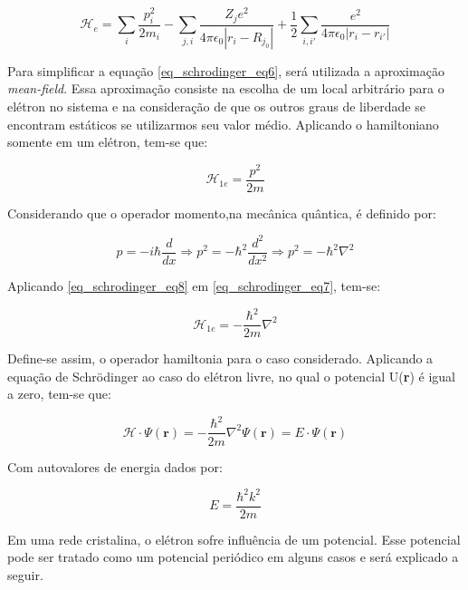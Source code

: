       \begin{equation}\label{eq_schrodinger_eq6}
        \mathcal{H}_{e} = 
          \sum_{i} \frac{p_{i}^2}{2m_{i}} 
          -  \sum_{j, i} \frac{Z_{j} e^2}{4\pi\epsilon_{0}\left|r_{i} - R_{j_{0}}\right|} 
          + \frac{1}{2} \sum_{i, i'} \frac{e^2}{4\pi\epsilon_{0}\left|r_{i} - r_{i'}\right|}
      \end{equation}

      \par Para simplificar a equação \eqref{eq_schrodinger_eq6}, será utilizada a aproximação \textit{mean-field}\cite{qm_fis10}. Essa aproximação consiste na escolha de um local arbitrário para o elétron no sistema e na consideração de que os outros graus de liberdade se encontram estáticos se utilizarmos seu valor médio. Aplicando o hamiltoniano somente em um elétron, tem-se que:

      \begin{equation}\label{eq_schrodinger_eq7}
        \mathcal{H}_{1e} = \frac{p^2}{2m}
      \end{equation}

      Considerando que o operador momento,na mecânica quântica, é definido por\cite{qm_fis11}:

      \begin{equation}\label{eq_schrodinger_eq8}
        p = -i\hbar\frac{d}{dx} \Longrightarrow
        p^2 = -\hbar^2 \frac{d^2}{dx^2} \Longrightarrow
        p^2 = -\hbar^2 \nabla^2
      \end{equation}

      Aplicando \eqref{eq_schrodinger_eq8} em \eqref{eq_schrodinger_eq7}, tem-se:

      \begin{equation}\label{eq_schrodinger_eq9}
        \mathcal{H}_{1e} = - \frac{\hbar^2}{2m}\nabla^2
      \end{equation}

      Define-se assim, o operador hamiltonia para o caso considerado. Aplicando a equação de Schrödinger ao caso do elétron livre, no qual o potencial U(\textbf{r}) é igual a zero, tem-se que:

      \begin{equation}\label{eq_schrodinger_eq10}
        \mathcal{H} \cdot \Psi(\mathbf{r}) =
          -\frac{\hbar^2}{2m} \nabla^2 \Psi(\mathbf{r}) =
          E \cdot \Psi(\mathbf{r})
      \end{equation}

      Com autovalores de energia dados por:

      \begin{equation}\label{eq_schrodinger_autovalores}
        E = \frac{\hbar^2 k^2}{2m}
      \end{equation}

      Em uma rede cristalina, o elétron sofre influência de um potencial. Esse potencial pode ser tratado como um potencial periódico\cite{qm_fis5} em alguns casos e será explicado a seguir.